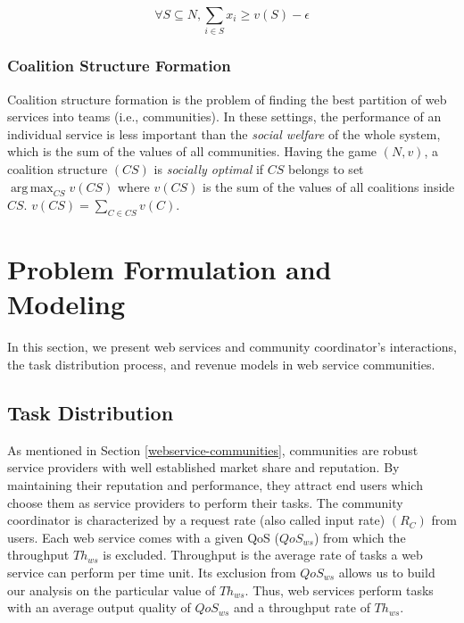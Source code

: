 \documentclass[10pt,journal,cspaper,compsoc]{IEEEtran}
\begin{document}
\begin{equation}\label{eq:core2}
\forall S \subseteq N, \sum_{i \in S} x_i \geq v(S) - \epsilon
\end{equation}

\subsubsection*{Coalition Structure Formation}\label{sec:coalition}

Coalition structure formation is the problem of finding the best
partition of web services into teams (i.e., communities). In these
settings, the performance of an individual service is less
important than the \emph{social welfare} of the whole system,
which is the sum of the values of all communities. Having the game
$(N,v)$, a coalition structure $(CS)$ is \emph{socially optimal}
if $CS$ belongs to set $\operatorname*{arg\,max}_{CS} v(CS)$ where
$v(CS)$ is the sum of the values of all coalitions inside $CS$.
$v(CS) = \sum_{C \in CS}v(C)$.





\section{Problem Formulation and Modeling}\label{s:model}

In this section, we present  web services and community
coordinator's interactions, the task distribution process, and
revenue models in web service communities.

\subsection{Task Distribution}

As mentioned in Section \ref{webservice-communities}, communities
are robust service providers with well established market share
and reputation. By maintaining their reputation and performance,
they attract  end users which choose them as service providers to
perform their tasks. The community coordinator is characterized by a
request rate (also called input rate) $(R_C)$ from users. Each web
service comes with a given QoS ($QoS_{ws}$) from which the
throughput $Th_{ws}$ is excluded. Throughput is the average rate
of tasks a web service can perform per time unit. Its exclusion
from $QoS_{ws}$ allows us to build our analysis on the particular
value of $Th_{ws}$. Thus, web services perform tasks with an
average output quality of $QoS_{ws}$ and a throughput rate of
$Th_{ws}$.
\end{document}

